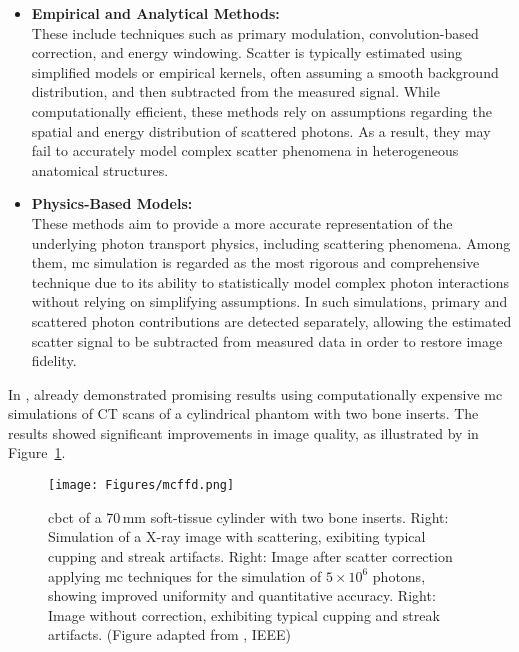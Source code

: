 \begin{itemize}
    \item \textbf{Empirical and Analytical Methods:} \\
        These include techniques such as primary modulation, convolution-based
        correction, and energy windowing. Scatter is typically estimated using
        simplified models or empirical kernels, often assuming a smooth
        background distribution, and then subtracted from the measured signal.
        While computationally efficient, these methods rely on assumptions
        regarding the spatial and energy distribution of scattered photons. As a
        result, they may fail to accurately model complex scatter phenomena in
        heterogeneous anatomical structures.

    \item \textbf{Physics-Based Models:} \\
        These methods aim to provide a more accurate representation of the
        underlying photon transport physics, including scattering phenomena.
        Among them, \ac{mc} simulation is regarded as the most rigorous and
        comprehensive technique due to its ability to statistically model
        complex photon interactions without relying on simplifying assumptions.
        In such simulations, primary and scattered photon contributions are
        detected separately, allowing the estimated scatter signal to be
        subtracted from measured data in order to restore image fidelity.
\end{itemize}

In \citeyear{mcffd2011}, \citeauthor{mcffd2011} \cite{mcffd2011} already
demonstrated promising results using computationally expensive \ac{mc}
simulations of CT scans of a cylindrical phantom with two bone inserts. The
results showed significant improvements in image quality, as illustrated by
\citeauthor{mcffd2011} in Figure~\ref{fig:scatter_correction_comparison}.

\captionsetup{justification=justified,singlelinecheck=false}
\begin{figure}[H]
    \centering
    \texttt{[image: Figures/mcffd.png]}
    \caption{\ac{cbct} of a 70\,mm soft-tissue cylinder with two bone inserts.
    Right: Simulation of a X-ray image with scattering, exibiting typical
    cupping and streak artifacts. Right: Image after scatter correction applying
    \ac{mc} techniques for the simulation of $5 \times 10^6$ photons, showing
    improved uniformity and quantitative accuracy. Right: Image without
    correction, exhibiting typical cupping and streak artifacts. (Figure adapted from \cite{mcffd2011},  IEEE)}
    \label{fig:scatter_correction_comparison}
\end{figure}


